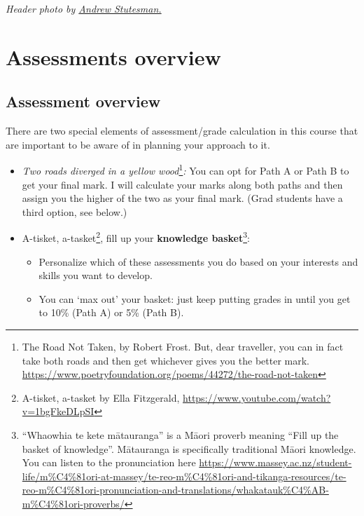 \documentclass[
  openany]{book}
\begin{document}
\emph{Header photo by \href{https://unsplash.com/@drewmark}{Andrew Stutesman.}}

\hypertarget{part-assessments-overview}{%
\part*{Assessments overview}\label{part-assessments-overview}}

\hypertarget{assessmentsoverview}{%
\chapter{Assessment overview}\label{assessmentsoverview}}

There are two special elements of assessment/grade calculation in this course that are important to be aware of in planning your approach to it.

\begin{itemize}
\item
  \emph{Two roads diverged in a yellow wood}\footnote{The Road Not Taken, by Robert Frost. But, dear traveller, you can in fact take both roads and then get whichever gives you the better mark. \url{https://www.poetryfoundation.org/poems/44272/the-road-not-taken}}\emph{:} You can opt for Path A or Path B to get your final mark. I will calculate your marks along both paths and then assign you the higher of the two as your final mark. (Grad students have a third option, see below.)
\item
  A-tisket, a-tasket\footnote{A-tisket, a-tasket by Ella Fitzgerald, \url{https://www.youtube.com/watch?v=1bgFkeDLpSI}}, fill up your \textbf{knowledge basket}\footnote{``Whaowhia te kete mātauranga'' is a Māori proverb meaning ``Fill up the basket of knowledge''. Mātauranga is specifically traditional Māori knowledge. You can listen to the pronunciation here \url{https://www.massey.ac.nz/student-life/m\%C4\%81ori-at-massey/te-reo-m\%C4\%81ori-and-tikanga-resources/te-reo-m\%C4\%81ori-pronunciation-and-translations/whakatauk\%C4\%AB-m\%C4\%81ori-proverbs/}}:

  \begin{itemize}
  \item
    Personalize which of these assessments you do based on your interests and skills you want to develop.
  \item
    You can `max out' your basket: just keep putting grades in until you get to 10\% (Path A) or 5\% (Path B).
  \end{itemize}
\end{itemize}
\end{document}
